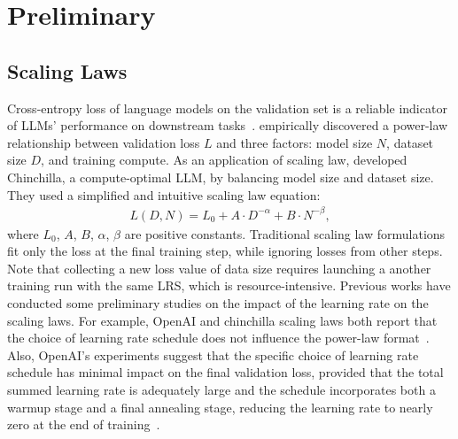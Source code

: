 \section{Preliminary}
\subsection{Scaling Laws}
Cross-entropy loss of language models on the validation set is a reliable indicator of LLMs' performance on downstream tasks~\citep{caballero2022broken,du2024understanding}. \citet{kaplan2020scaling} empirically discovered a power-law relationship between validation loss $L$ and three factors: model size $N$, dataset size $D$, and training compute.
As an application of scaling law, \citet{hoffmann2022training} developed Chinchilla, a compute-optimal LLM, by balancing model size and dataset size. They used a simplified and intuitive scaling law equation:
\begin{equation}
\begin{aligned}
    L (D,N) = L_0 + A\cdot D^{-\alpha} + B\cdot N^{-\beta},
\end{aligned}
\label{eq:chinchilla}
\end{equation}
where $L_0$, $A$, $B$, $\alpha$, $\beta$ are positive constants. 
Traditional scaling law formulations fit only the loss at the final training step, while ignoring losses from other steps. Note that collecting a new loss value of data size requires launching a another training run with the same LRS, which is resource-intensive.
Previous works have conducted some preliminary studies on the impact of the learning rate on the scaling laws.
For example, OpenAI and chinchilla scaling laws both report that the choice of learning
rate schedule does not influence the power-law format~\citep{kaplan2020scaling,hoffmann2022training}. 
Also, OpenAI's experiments suggest that the specific choice of learning rate schedule has minimal impact on the final validation loss, provided that the total summed learning rate is adequately large and the schedule incorporates both a warmup stage and a final annealing stage, reducing the learning rate to nearly zero at the end of training~\citep{kaplan2020scaling}.

